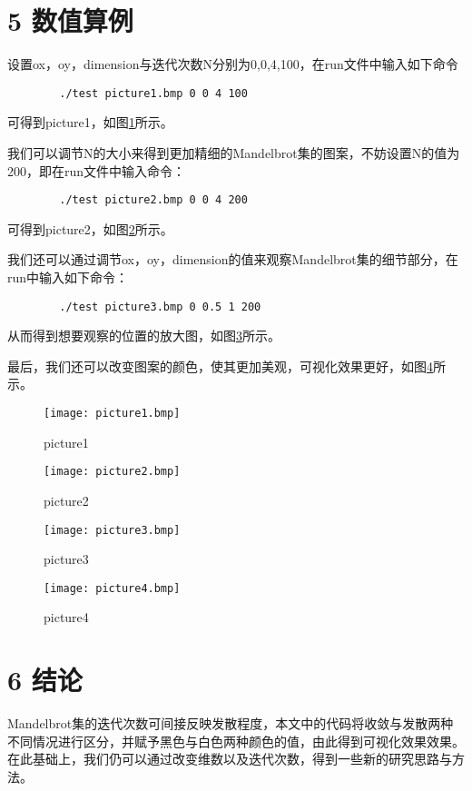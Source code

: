 \documentclass[twocolumn]{ctexart}
\begin{document}
	\section*{5 数值算例}
	设置ox，oy，dimension与迭代次数N分别为0,0,4,100，在run文件中输入如下命令
	\begin{verbatim}
		./test picture1.bmp 0 0 4 100
	\end{verbatim}
	可得到picture1，如图\ref{fig:1}所示。
	
	我们可以调节N的大小来得到更加精细的Mandelbrot集的图案，不妨设置N的值为200，即在run文件中输入命令：
	\begin{verbatim}
		./test picture2.bmp 0 0 4 200
	\end{verbatim}
	可得到picture2，如图\ref{fig:2}所示。
	
	我们还可以通过调节ox，oy，dimension的值来观察Mandelbrot集的细节部分，在run中输入如下命令：
	\begin{verbatim}
		./test picture3.bmp 0 0.5 1 200
	\end{verbatim}
	从而得到想要观察的位置的放大图，如图\ref{fig:3}所示。
	
	最后，我们还可以改变图案的颜色，使其更加美观，可视化效果更好，如图\ref{fig:4}所示。
    \begin{figure}[htbp]
      	\texttt{[image: picture1.bmp]}
      	      	\caption{picture1}
      	\label{fig:1}
    \end{figure}
 	\begin{figure}[htbp]
 		\texttt{[image: picture2.bmp]}
 		\caption{picture2}
 		\label{fig:2}
 	\end{figure}
 	\begin{figure}[htbp]
 		\texttt{[image: picture3.bmp]}
 		\caption{picture3}
 		\label{fig:3}
 	\end{figure}
 	\begin{figure}[htbp]
 		\texttt{[image: picture4.bmp]}
 		\caption{picture4}
 		\label{fig:4}
 	\end{figure}
 
	\section*{6 结论}
	Mandelbrot集的迭代次数可间接反映发散程度，本文中的代码将收敛与发散两种不同情况进行区分，并赋予黑色与白色两种颜色的值，由此得到可视化效果效果。在此基础上，我们仍可以通过改变维数以及迭代次数，得到一些新的研究思路与方法。
	
	
	
\end{document}
